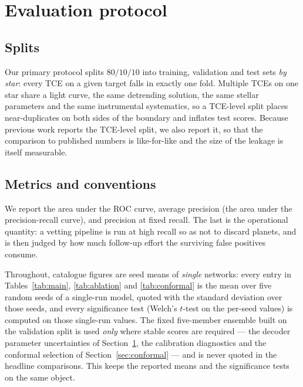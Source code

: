\documentclass[preprint,12pt,authoryear]{elsarticle}
\begin{document}
\section{Evaluation protocol}
\label{sec:protocol}

\subsection{Splits}
\label{sec:splits}

Our primary protocol splits $80/10/10$ into training, validation and test sets
\emph{by star}: every TCE on a given target falls in exactly one fold. Multiple
TCEs on one star share a light curve, the same detrending solution, the same
stellar parameters and the same instrumental systematics, so a TCE-level split
places near-duplicates on both sides of the boundary and inflates test scores.
Because previous work reports the TCE-level split, we also report it, so that
the comparison to published numbers is like-for-like and the size of the leakage
is itself measurable.

\subsection{Metrics and conventions}
\label{sec:conventions}

We report the area under the ROC curve, average precision (the area under the
precision-recall curve), and precision at fixed recall. The last is the
operational quantity: a vetting pipeline is run at high recall so as not to
discard planets, and is then judged by how much follow-up effort the surviving
false positives consume.

Throughout, catalogue figures are seed means of \emph{single} networks: every
entry in Tables~\ref{tab:main}, \ref{tab:ablation} and \ref{tab:conformal} is the
mean over five random seeds of a single-run model, quoted with the standard
deviation over those seeds, and every significance test (Welch's $t$-test
\citep{Welch1947} on the per-seed values) is computed on those single-run
values. The fixed five-member ensemble built on the validation split is used
\emph{only} where stable scores are required --- the decoder parameter
uncertainties of Section~\ref{sec:protocol}, the calibration diagnostics and the
conformal selection of Section~\ref{sec:conformal} --- and is never quoted in the
headline comparisons. This keeps the reported means and the significance tests on
the same object.
\end{document}
